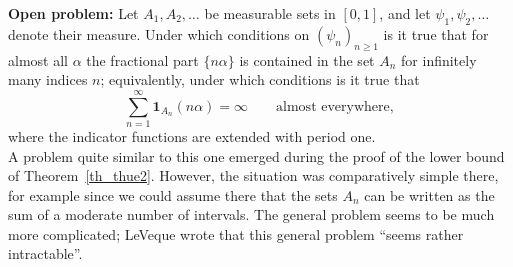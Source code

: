 \documentclass[12pt]{amsart}
\begin{document}
\textbf{Open problem:} \quad Let $A_1, A_2, \dots$ be measurable sets in $[0,1]$, and let $\psi_1, \psi_2, \dots$ denote their measure. Under which conditions on $(\psi_n)_{n \geq 1}$ is it true that for almost all $\alpha$ the fractional part $\{n \alpha\}$ is contained in the set $A_n$ for infinitely many indices $n$; equivalently, under which conditions is it true that 
$$
\sum_{n=1}^\infty \mathbf{1}_{A_n} (n \alpha) = \infty \qquad \textrm{almost everywhere},
$$
where the indicator functions are extended with period one.\\

A problem quite similar to this one emerged during the proof of the lower bound of Theorem~\ref{th_thue2}. However, the situation was comparatively simple there, for example since we could assume there that the sets $A_n$ can be written as the sum of a moderate number of intervals. The general problem seems to be much more complicated; LeVeque wrote that this general problem ``seems rather intractable''.
\end{document}
